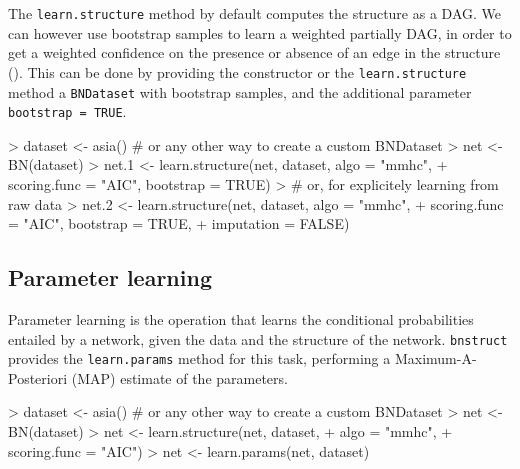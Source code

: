 \documentclass{article}
\newcommand{\Robject}[1]{{\texttt{#1}}}
\newcommand{\Rpackage}[1]{{\texttt{#1}}}
\newcommand{\Rmethod}[1]{{\texttt{#1}}}
\newcommand{\Rfunarg}[1]{{\texttt{#1}}}
\begin{document}

The \Rmethod{learn.structure} method by default computes the structure as a DAG. We can however use
bootstrap samples to learn a weighted partially DAG, in order to get a weighted confidence on the presence or
absence of an edge in the structure (\citet*{friedman1999data}). This can be done by providing the constructor or the \Rmethod{learn.structure}
method a \Robject{BNDataset} with bootstrap samples, and the additional parameter \Rfunarg{bootstrap = TRUE}.
\begin{Schunk}
\begin{Sinput}
> dataset <- asia() # or any other way to create a custom BNDataset
> net     <- BN(dataset)
> net.1   <- learn.structure(net, dataset, algo = "mmhc",
+               scoring.func = "AIC", bootstrap = TRUE)
> # or, for explicitely learning from raw data
> net.2   <- learn.structure(net, dataset, algo = "mmhc",
+               scoring.func = "AIC", bootstrap = TRUE,
+               imputation = FALSE)
\end{Sinput}
\end{Schunk}

\subsection{Parameter learning}
Parameter learning is the operation that learns the conditional probabilities entailed by a network,
given the data and the structure of the network. \Rpackage{bnstruct} provides the \Rmethod{learn.params} method for this task,
performing a Maximum-A-Posteriori (MAP) estimate of the parameters.
\begin{Schunk}
\begin{Sinput}
> dataset <- asia() # or any other way to create a custom BNDataset
> net     <- BN(dataset)
> net     <- learn.structure(net, dataset, 
+                            algo = "mmhc",
+                            scoring.func = "AIC")
> net     <- learn.params(net, dataset)
\end{Sinput}
\end{Schunk}
\end{document}
